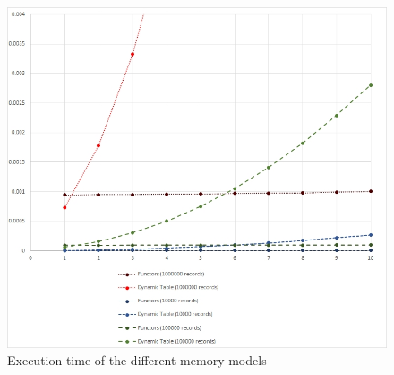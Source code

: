 \begin{figure}
	\includegraphics[width = \columnwidth]{Figures/functor_chart.jpg}
	\caption{Execution time of the different memory models}
	\label{fig:chart}
\end{figure}
